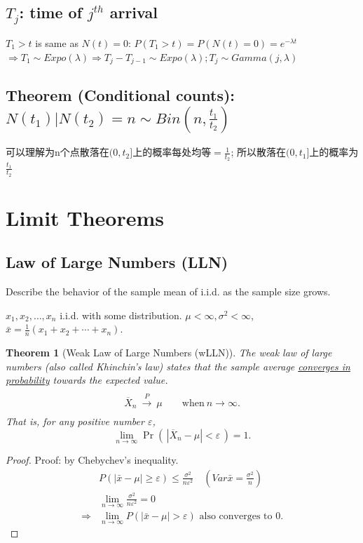 \documentclass[11pt,a4paper]{article}
\newtheorem{theorem}{Theorem}
\begin{document}
\subsection{$T_j$: time of $j^{th}$ arrival}
$T_1>t$ is same as $N(t)=0$: $P(T_1>t)=P(N(t)=0)=e^{-\lambda t}$\\
$\Rightarrow T_1\sim Expo(\lambda) \Rightarrow T_j-T_{j-1}\sim Expo(\lambda); T_j\sim Gamma(j,\lambda)$

\subsection{Theorem (Conditional counts): $N(t_1)|N(t_2)=n\sim Bin(n,\frac{t_1}{t_2})$}
可以理解为n个点散落在$(0,t_2]$上的概率每处均等$=\frac{1}{t_2}$; 所以散落在$(0,t_1]$上的概率为$\frac{t_1}{t_2}$

\section{Limit Theorems}
\subsection{Law of Large Numbers (LLN)}
Describe the behavior of the sample mean of i.i.d. as the sample size grows.

$x_{1}, x_{2}, \ldots, x_{n}$ i.i.d. with some distribution. $\mu<\infty,\sigma^{2}<\infty$,$\bar{x}=\frac{1}{n}\left(x_{1}+x_{2}+\cdots+x_{n}\right)$.

\begin{theorem}[Weak Law of Large Numbers (wLLN)]
    \quad

    The weak law of large numbers (also called Khinchin's law) states that the sample average \underline{converges in probability} towards the expected value.
    $${\displaystyle {\begin{matrix}{}\\{\overline {X}}_{n}\ {\xrightarrow {P}}\ \mu \qquad {\text{when}}\ n\to \infty .\\{}\end{matrix}}}$$
    That is, for any positive number $\varepsilon$,
    $${\displaystyle \lim _{n\to \infty }\Pr \!\left(\,|{\overline {X}}_{n}-\mu |<\varepsilon \,\right)=1.}$$
\end{theorem}
\begin{proof}
\quad

Proof: by Chebychev's inequality.
$$
\begin{aligned}
&P(|\bar{x}-\mu|\geq\varepsilon) \leq \frac{\sigma^{2}}{n \varepsilon^{2}} \quad (Var\bar{x}=\frac{\sigma^{2}}{n}) \\
&\lim_{n \rightarrow \infty}\frac{\sigma^{2}}{n \varepsilon^{2}}=0\\
\Rightarrow&\lim_{n \rightarrow \infty}P(|\bar{x}-\mu|>\varepsilon) \text { also converges to } 0 .
\end{aligned}
$$
\end{proof}
\end{document}
